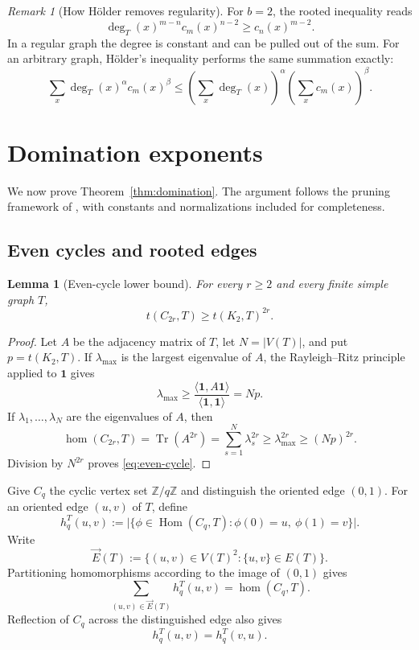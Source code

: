\documentclass[11pt]{article}
\newtheorem{lemma}[theorem]{Lemma}
\theoremstyle{definition}
\theoremstyle{remark}
\newtheorem{remark}[theorem]{Remark}
\newcommand{\Hom}{\operatorname{Hom}}
\newcommand{\homn}{\operatorname{hom}}
\newcommand{\tr}{\operatorname{Tr}}
\newcommand{\one}{\mathbf{1}}
\begin{document}
\begin{remark}[How H\"older removes regularity]
  For $b=2$, the rooted inequality reads
  \[
    \deg_T(x)^{m-n}c_m(x)^{n-2}
    \ge c_n(x)^{m-2}.
  \]
  In a regular graph the degree is constant and can be pulled out of
  the sum.  For an arbitrary graph, H\"older's inequality performs the
  same summation exactly:
  \[
    \sum_x\deg_T(x)^\alpha c_m(x)^\beta
    \le
    \left(\sum_x\deg_T(x)\right)^\alpha
    \left(\sum_xc_m(x)\right)^\beta.
  \]
\end{remark}

\section{Domination exponents}

We now prove Theorem~\ref{thm:domination}.  The argument follows the
pruning framework of \cite[Theorem~4.6]{BRRW2025}, with constants and
normalizations included for completeness.

\subsection{Even cycles and rooted edges}

\begin{lemma}[Even-cycle lower bound]
  \label{lem:even-cycle}
  For every $r\ge2$ and every finite simple graph $T$,
  \begin{equation}
    t(C_{2r},T)\ge t(K_2,T)^{2r}.
    \label{eq:even-cycle}
  \end{equation}
\end{lemma}

\begin{proof}
  Let $A$ be the adjacency matrix of $T$, let $N=|V(T)|$, and put
  $p=t(K_2,T)$.  If $\lambda_{\max}$ is the largest eigenvalue of $A$,
  the Rayleigh--Ritz principle applied to $\one$ gives
  \[
    \lambda_{\max}
    \ge
    \frac{\langle\one,A\one\rangle}{\langle\one,\one\rangle}
    =Np.
  \]
  If $\lambda_1,\ldots,\lambda_N$ are the eigenvalues of $A$, then
  \[
    \homn(C_{2r},T)
    =\tr(A^{2r})
    =\sum_{s=1}^N\lambda_s^{2r}
    \ge\lambda_{\max}^{2r}
    \ge(Np)^{2r}.
  \]
  Division by $N^{2r}$ proves \eqref{eq:even-cycle}.
\end{proof}

Give $C_q$ the cyclic vertex set $\mathbb{Z}/q\mathbb{Z}$ and
distinguish the oriented edge $(0,1)$.  For an oriented edge $(u,v)$
of $T$, define
\[
  h_q^T(u,v)
  :=
  \bigl|\{\phi\in\Hom(C_q,T):
  \phi(0)=u,\ \phi(1)=v\}\bigr|.
\]
Write
\[
  \vec E(T)
  :=\{(u,v)\in V(T)^2:\{u,v\}\in E(T)\}.
\]
Partitioning homomorphisms according to the image of $(0,1)$ gives
\begin{equation}
  \sum_{(u,v)\in\vec E(T)}h_q^T(u,v)=\homn(C_q,T).
  \label{eq:rooted-edge-sum}
\end{equation}
Reflection of $C_q$ across the distinguished edge also gives
\begin{equation}
  h_q^T(u,v)=h_q^T(v,u).
  \label{eq:rooted-edge-symmetry}
\end{equation}
\end{document}
